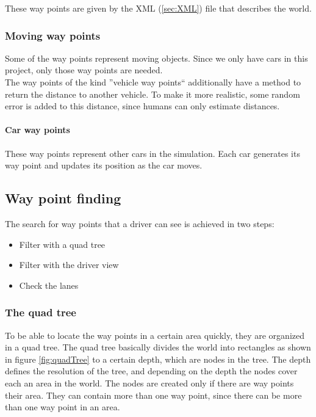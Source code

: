 These way points are given by the XML (\ref{sec:XML}) file that describes the 
world.

\subsubsection{Moving way points}

Some of the way points represent moving objects. Since we only have cars in this
project, only those way points are needed. \\

The way points of the kind ''vehicle way points`` additionally have a method to 
return the distance to another vehicle. To make it more realistic, some random 
error is added to this distance, since humans can only estimate distances.

\paragraph{Car way points}

These way points represent other cars in the simulation. Each car generates its
way point and updates its position as the car moves.

\subsection{Way point finding}

The search for way points that a driver can see is achieved in two steps:

\begin{itemize}
\item Filter with a quad tree
\item Filter with the driver view
\item Check the lanes
\end{itemize}


\subsubsection{The quad tree}
\label{sec:quadTree}

To be able to locate the way points in a certain area quickly, they are 
organized in a quad tree. The quad tree basically divides the world into 
rectangles as shown in figure \ref{fig:quadTree} to a certain depth, which are 
nodes in the tree. The depth defines the resolution of the tree, and depending
on the depth the nodes cover each an area in the world. The nodes 
are created only if there are way points their area. They can contain
more than one way point, since there can be more than one way point in an 
area.\\

